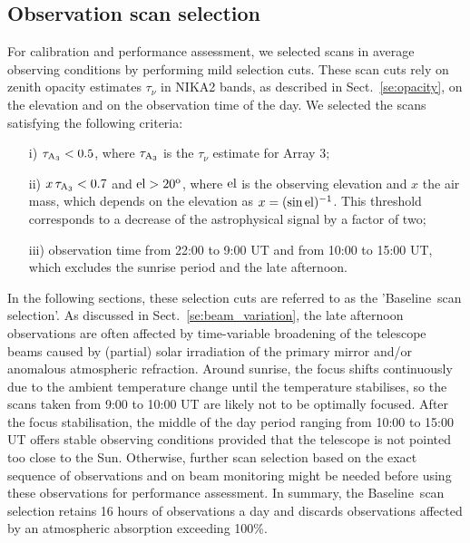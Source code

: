 \documentclass[traditionalabstract]{aa}
\newcommand{\elev}{\rm{el}}
\newcommand{\baseline}{Baseline}%
\newcommand{\taunu}{\tau_{\nu}}
\newcommand{\airmass}{air mass}
\newcommand{\lp}[1]{#1}
\begin{document}
{\subsection{Observation scan selection}
\label{se:data_selection}

For calibration and performance assessment, we selected scans in average
observing conditions by performing mild selection cuts. These scan
cuts rely on zenith opacity estimates $\taunu$ in NIKA2 bands, as
described in Sect.~\ref{se:opacity}, on the elevation and on the
observation time of the day. We selected the scans satisfying the
following criteria:
%
\begin{itemize}
\item[i)] $\tau_{\rm{A_3}} < 0.5$, where $\tau_{\rm{A_3}}$ is the $\taunu$ estimate for
  Array 3; 
\item[ii)] $x\, \tau_{\rm{A_3}} < 0.7$ and $\elev > 20^{o}$, where
$\elev$ is the observing elevation and $x$ the
  \airmass, which depends on the elevation as $x=(\sin{\elev})^{-1}$. This
  threshold corresponds to a decrease of the astrophysical signal by a
  factor of two;
\item[iii)] observation time from 22:00 to 9:00 UT and from 10:00 to
  15:00 UT, which excludes the sunrise period and the late afternoon.
\end{itemize}
%
{\lp In the following sections, these selection cuts are referred to as the 
'\baseline\ scan selection'.}  
As discussed in Sect.~\ref{se:beam_variation}, the late afternoon
observations are often affected by time-variable broadening of the
telescope beams caused by (partial) solar irradiation of the primary
mirror and/or anomalous atmospheric refraction.
Around sunrise, the focus shifts continuously due to the ambient temperature
change until the temperature stabilises, so the scans taken from
9:00 to 10:00 UT are likely not to be optimally focused.
After the focus stabilisation, the middle of the day period ranging
from 10:00 to 15:00 UT offers stable observing conditions
provided that the telescope is not pointed too
close to the Sun.
Otherwise, further scan selection based on
the exact sequence of observations and on beam monitoring might be
needed before using these observations for performance assessment.
{\lp In summary, the \baseline\ scan selection retains 16 hours of
observations a day and discards observations affected by an
atmospheric absorption exceeding 100\%.}  


}
\end{document}
